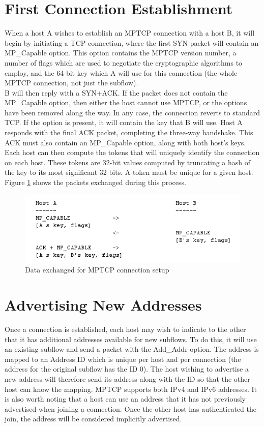 \section{First Connection Establishment}
When a host A wishes to establish an MPTCP connection with a host B, it will begin by initiating a TCP connection, where the first SYN packet will contain an MP\_Capable option. This option contains the MPTCP version number, a number of flags which are used to negotiate the cryptographic algorithms to employ, and the 64-bit key which A will use for this connection (the whole MPTCP connection, not just the subflow). \\

B will then reply with a SYN+ACK. If the packet does not contain the MP\_Capable option, then either the host cannot use MPTCP, or the options have been removed along the way. In any case, the connection reverts to standard TCP. If the option is present, it will contain the key that B will use. Host A responds with the final ACK packet, completing the three-way handshake. This ACK must also contain an MP\_Capable option, along with both host's keys. \\

Each host can then compute the tokens that will uniquely identify the connection on each host. These tokens are 32-bit values computed by truncating a hash of the key to its most significant 32 bits. A token must be unique for a given host. Figure  \ref{pic:mpcapex} shows the packets exchanged during this process.

\begin{figure}[!t]
\centering
\includegraphics[scale= 0.6]{Figures/mpcapex.png}
\caption{Data exchanged for MPTCP connection setup}
\label{pic:mpcapex}
\end{figure}

\section{Advertising New Addresses}
Once a connection is established, each host may wish to indicate to the other that it has additional addresses available for new subflows. To do this, it will use an existing subflow and send a packet with the Add\_Addr option. The address is mapped to an Address ID which is unique per host and per connection (the address for the original subflow has the ID 0). The host wishing to advertise a new address will therefore send its address along with the ID so that the other host can know the mapping. MPTCP supports both IPv4 and IPv6 addresses. It is also worth noting that a host can use an address that it has not previously advertised when joining a connection. Once the other host has authenticated the join, the address will be considered implicitly advertised.\\

